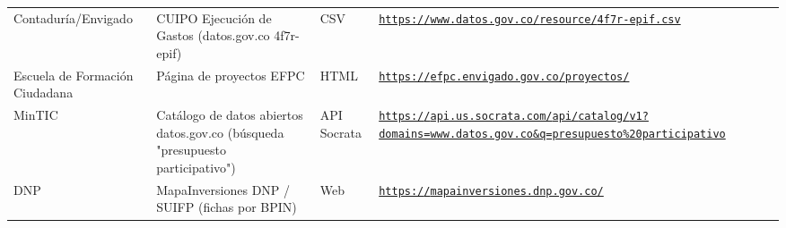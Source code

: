 \documentclass[11pt,letterpaper]{article}
\begin{document}
{\begin{xltabular}{\linewidth}{L{2.8cm}YL{1.6cm}Y}
Contaduría/\allowbreak{}Envigado & CUIPO Ejecución de Gastos (datos.\allowbreak{}gov.\allowbreak{}co 4f7r-epif) & CSV & \texttt{\footnotesize \href{https://www.datos.gov.co/resource/4f7r-epif.csv}{https:/\allowbreak{}}\allowbreak{}\href{https://www.datos.gov.co/resource/4f7r-epif.csv}{/\allowbreak{}}\allowbreak{}\href{https://www.datos.gov.co/resource/4f7r-epif.csv}{www.\allowbreak{}datos.\allowbreak{}gov.\allowbreak{}co/\allowbreak{}}\allowbreak{}\href{https://www.datos.gov.co/resource/4f7r-epif.csv}{resource/\allowbreak{}}\allowbreak{}\href{https://www.datos.gov.co/resource/4f7r-epif.csv}{4f7r-\allowbreak{}epif.\allowbreak{}csv}} \\
Escuela de Formación Ciudadana & Página de proyectos EFPC & HTML & \texttt{\footnotesize \href{https://efpc.envigado.gov.co/proyectos/}{https:/\allowbreak{}}\allowbreak{}\href{https://efpc.envigado.gov.co/proyectos/}{/\allowbreak{}}\allowbreak{}\href{https://efpc.envigado.gov.co/proyectos/}{efpc.\allowbreak{}envigado.\allowbreak{}gov.\allowbreak{}co/\allowbreak{}}\allowbreak{}\href{https://efpc.envigado.gov.co/proyectos/}{proyectos/\allowbreak{}}} \\
MinTIC & Catálogo de datos abiertos datos.\allowbreak{}gov.\allowbreak{}co (búsqueda "presupuesto participativo") & API Socrata & \texttt{\footnotesize \href{https://api.us.socrata.com/api/catalog/v1?domains=www.datos.gov.co\&q=presupuesto\%20participativo}{https:/\allowbreak{}}\allowbreak{}\href{https://api.us.socrata.com/api/catalog/v1?domains=www.datos.gov.co\&q=presupuesto\%20participativo}{/\allowbreak{}}\allowbreak{}\href{https://api.us.socrata.com/api/catalog/v1?domains=www.datos.gov.co\&q=presupuesto\%20participativo}{api.\allowbreak{}us.\allowbreak{}socrata.\allowbreak{}com/\allowbreak{}}\allowbreak{}\href{https://api.us.socrata.com/api/catalog/v1?domains=www.datos.gov.co\&q=presupuesto\%20participativo}{api/\allowbreak{}}\allowbreak{}\href{https://api.us.socrata.com/api/catalog/v1?domains=www.datos.gov.co\&q=presupuesto\%20participativo}{catalog/\allowbreak{}}\allowbreak{}\href{https://api.us.socrata.com/api/catalog/v1?domains=www.datos.gov.co\&q=presupuesto\%20participativo}{v1?\allowbreak{}domains=\allowbreak{}www.\allowbreak{}datos.\allowbreak{}gov.\allowbreak{}co\&\allowbreak{}q=\allowbreak{}presupuesto\%20participativo}} \\
DNP & MapaInversiones DNP /\allowbreak{} SUIFP (fichas por BPIN) & Web & \texttt{\footnotesize \href{https://mapainversiones.dnp.gov.co/}{https:/\allowbreak{}}\allowbreak{}\href{https://mapainversiones.dnp.gov.co/}{/\allowbreak{}}\allowbreak{}\href{https://mapainversiones.dnp.gov.co/}{mapainversiones.\allowbreak{}dnp.\allowbreak{}gov.\allowbreak{}co/\allowbreak{}}} \\
\end{xltabular}
}
\end{document}
